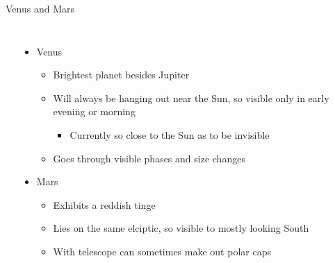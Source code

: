\documentclass[pdf, ]{beamer}
\begin{document}
\begin{frame}{Venus and Mars}
\begin{columns}
\begin{center}
		\end{center}
		\begin{itemize}
			\item<1-> Venus
				\begin{itemize}
					\item Brightest planet besides Jupiter
					\item Will always be hanging out near the Sun, so visible only in early evening or morning
						\begin{itemize}
							\item Currently so close to the Sun as to be invisible
						\end{itemize}
					\item Goes through visible phases and size changes
				\end{itemize}
			\item<2-> Mars
				\begin{itemize}
					\item Exhibits a reddish tinge
					\item Lies on the same elciptic, so visible to mostly looking South
					\item With telescope can sometimes make out polar caps
				\end{itemize}
		\end{itemize}
	\end{columns}
\end{frame}
\end{document}
